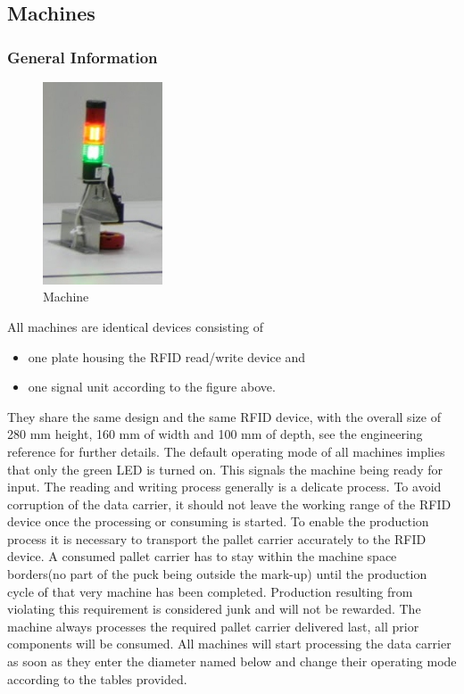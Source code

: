 \documentclass[12pt,twoside]{article}
\begin{document}
\subsection{Machines}
\label{sec:machines}

\subsubsection{General Information}

\begin{figure}[h]
  \centering
  \includegraphics[height=6cm]{Machine}
  \caption{Machine}
  \label{fig:machine}
\end{figure}

All machines are identical devices consisting of 
\begin{itemize}
\item one plate housing the RFID read/write device and
\item one signal unit according to the figure above.
\end{itemize}

They share the same design and the same RFID device, with the overall
size of 280 mm height, 160 mm of width and 100 mm of depth, see the
engineering reference for further details. The default operating mode
of all machines implies that only the green LED is turned on. This
signals the machine being ready for input. The reading and writing
process generally is a delicate process. To avoid corruption of the
data carrier, it should not leave the working range of the RFID device
once the processing or consuming is started. To enable the production
process it is necessary to transport the pallet carrier accurately to
the RFID device. A consumed pallet carrier has to stay within the
machine space borders(no part of the puck being outside the mark-up)
until the production cycle of that very machine has been
completed. Production resulting from violating this requirement is
considered junk and will not be rewarded. The machine always processes
the required pallet carrier delivered last, all prior components will
be consumed. All machines will start processing the data carrier as
soon as they enter the diameter named below and change their operating
mode according to the tables provided.
\end{document}

